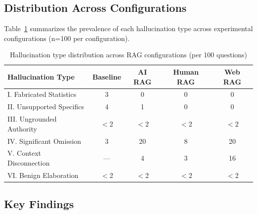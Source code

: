 \subsection{Distribution Across Configurations}

Table~\ref{tab:hallucination_distribution} summarizes the prevalence of each hallucination type across experimental configurations (n=100 per configuration).

\begin{table}[h]
\centering
\caption{Hallucination type distribution across RAG configurations (per 100 questions)}
\label{tab:hallucination_distribution}
\begin{tabular}{lcccc}
\hline
\textbf{Hallucination Type} & \textbf{Baseline} & \textbf{AI RAG} & \textbf{Human RAG} & \textbf{Web RAG} \\
\hline
I. Fabricated Statistics     & 3  & 0  & 0  & 0  \\
II. Unsupported Specifics    & 4  & 1  & 0  & 0  \\
III. Ungrounded Authority    & $<$2 & $<$2 & $<$2 & $<$2 \\
IV. Significant Omission     & 3  & 20 & 8  & 20 \\
V. Context Disconnection     & --- & 4  & 3  & 16 \\
VI. Benign Elaboration       & $<$2 & $<$2 & $<$2 & $<$2 \\
\hline
\end{tabular}
\end{table}

\subsection{Key Findings}

